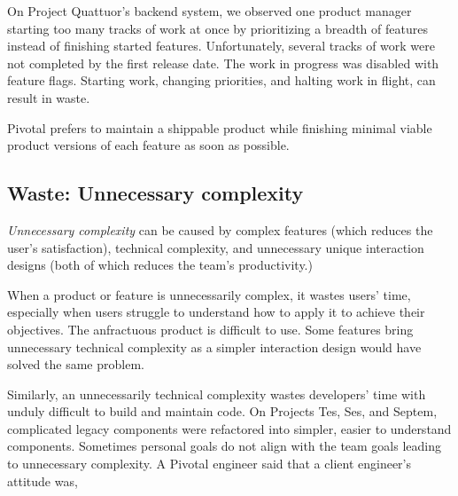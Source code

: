 On Project Quattuor's backend system, we observed one product manager starting too many tracks of work at once by prioritizing a breadth of features instead of finishing started features. Unfortunately, several tracks of work were not completed by the first release date. The work in progress was disabled with feature flags. Starting work, changing priorities, and halting work in flight, can result in waste.

Pivotal prefers to maintain a shippable product while finishing minimal viable product versions of each feature as soon as possible. 

\subsection{Waste: Unnecessary complexity}
\textit{Unnecessary complexity} can be caused by complex features (which reduces the user's satisfaction), technical complexity, and unnecessary unique interaction designs (both of which reduces the team's productivity.) 

When a product or feature is unnecessarily complex, it wastes users' time, especially when users struggle to understand how to apply it to achieve their objectives. The anfractuous product is difficult to use. Some features bring unnecessary technical complexity as a simpler interaction design would have solved the same problem. %

Similarly, an unnecessarily technical complexity wastes developers' time with unduly difficult to build and maintain code. On Projects Tes, Ses, and Septem, complicated legacy components were refactored into simpler, easier to understand components. Sometimes personal goals do not align with the team goals leading to unnecessary complexity. A Pivotal engineer said that a client engineer's attitude was, 

